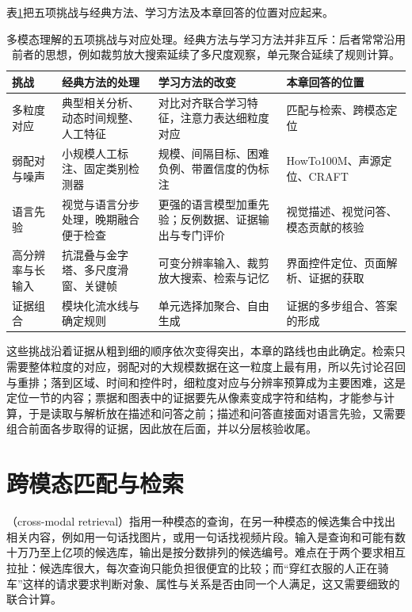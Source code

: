 表\ref{tab:vision-understanding-challenge-map}把五项挑战与经典方法、学习方法及本章回答的位置对应起来。

\begin{table}[tbp]
  \centering
  \small
  \begin{tabularx}{\linewidth}{@{}p{24mm}XXX@{}}
    \toprule
    挑战 & 经典方法的处理 & 学习方法的改变 & 本章回答的位置\\
    \midrule
    多粒度对应 & 典型相关分析、动态时间规整、人工特征 & 对比对齐联合学习特征，注意力表达细粒度对应 & 匹配与检索、跨模态定位\\
    弱配对与噪声 & 小规模人工标注、固定类别检测器 & 规模、间隔目标、困难负例、带置信度的伪标注 & HowTo100M、声源定位、CRAFT\\
    语言先验 & 视觉与语言分步处理，晚期融合便于检查 & 更强的语言模型加重先验；反例数据、证据输出与专门评价 & 视觉描述、视觉问答、模态贡献的核验\\
    高分辨率与长输入 & 抗混叠与金字塔、多尺度滑窗、关键帧 & 可变分辨率输入、裁剪放大搜索、检索与记忆 & 界面控件定位、页面解析、证据的获取\\
    证据组合 & 模块化流水线与确定规则 & 单元选择加聚合、自由生成 & 证据的多步组合、答案的形成\\
    \bottomrule
  \end{tabularx}
  \caption{多模态理解的五项挑战与对应处理。经典方法与学习方法并非互斥：后者常常沿用前者的思想，例如裁剪放大搜索延续了多尺度观察，单元聚合延续了规则计算。}
  \label{tab:vision-understanding-challenge-map}
\end{table}

这些挑战沿着证据从粗到细的顺序依次变得突出，本章的路线也由此确定。检索只需要整体粒度的对应，弱配对的大规模数据在这一粒度上最有用，所以先讨论召回与重排；落到区域、时间和控件时，细粒度对应与分辨率预算成为主要困难，这是定位一节的内容；票据和图表中的证据要先从像素变成字符和结构，才能参与计算，于是读取与解析放在描述和问答之前；描述和问答直接面对语言先验，又需要组合前面各步取得的证据，因此放在后面，并以分层核验收尾。

\section{跨模态匹配与检索}
\label{sec:vision-understanding-retrieval}

（cross-modal retrieval）指用一种模态的查询，在另一种模态的候选集合中找出相关内容，例如用一句话找图片，或用一句话找视频片段。输入是查询和可能有数十万乃至上亿项的候选库，输出是按分数排列的候选编号。难点在于两个要求相互拉扯：候选库很大，每次查询只能负担很便宜的比较；而“穿红衣服的人正在骑车”这样的请求要求判断对象、属性与关系是否由同一个人满足，这又需要细致的联合计算。

